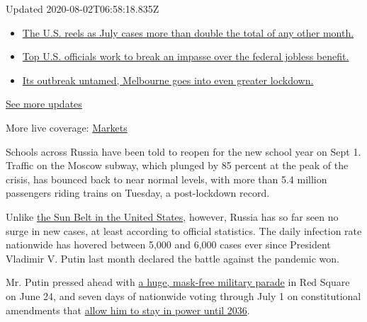 Updated 2020-08-02T06:58:18.835Z

\begin{itemize}
\tightlist
\item
  \href{https://www.nytimes.com/2020/08/01/world/coronavirus-covid-19.html?action=click\&pgtype=Article\&state=default\&region=MAIN_CONTENT_1\&context=storylines_live_updates\#link-34047410}{The
  U.S. reels as July cases more than double the total of any other
  month.}
\item
  \href{https://www.nytimes.com/2020/08/01/world/coronavirus-covid-19.html?action=click\&pgtype=Article\&state=default\&region=MAIN_CONTENT_1\&context=storylines_live_updates\#link-780ec966}{Top
  U.S. officials work to break an impasse over the federal jobless
  benefit.}
\item
  \href{https://www.nytimes.com/2020/08/01/world/coronavirus-covid-19.html?action=click\&pgtype=Article\&state=default\&region=MAIN_CONTENT_1\&context=storylines_live_updates\#link-2bc8948}{Its
  outbreak untamed, Melbourne goes into even greater lockdown.}
\end{itemize}

\href{https://www.nytimes.com/2020/08/01/world/coronavirus-covid-19.html?action=click\&pgtype=Article\&state=default\&region=MAIN_CONTENT_1\&context=storylines_live_updates}{See
more updates}

More live coverage:
\href{https://www.nytimes.com/live/2020/07/31/business/stock-market-today-coronavirus?action=click\&pgtype=Article\&state=default\&region=MAIN_CONTENT_1\&context=storylines_live_updates}{Markets}

Schools across Russia have been told to reopen for the new school year
on Sept 1. Traffic on the Moscow subway, which plunged by 85 percent at
the peak of the crisis, has bounced back to near normal levels, with
more than 5.4 million passengers riding trains on Tuesday, a
post-lockdown record.

Unlike
\href{https://www.nytimes.com/2020/06/14/us/coronavirus-united-states.html}{the
Sun Belt in the United States}, however, Russia has so far seen no surge
in new cases, at least according to official statistics. The daily
infection rate nationwide has hovered between 5,000 and 6,000 cases ever
since President Vladimir V. Putin last month declared the battle against
the pandemic won.

Mr. Putin pressed ahead with
\href{https://www.nytimes.com/2020/06/24/world/europe/russia-coronavirus-parade.html}{a
huge, mask-free military parade} in Red Square on June 24, and seven
days of nationwide voting through July 1 on constitutional amendments
that
\href{https://www.nytimes.com/2020/07/01/world/europe/putin-referendum-vote-russia.html}{allow
him to stay in power until 2036}.


